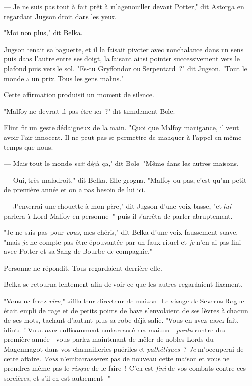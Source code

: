 --- Je ne suis pas tout à fait prêt à m'agenouiller devant Potter," dit Astorga en regardant Jugson droit dans les yeux.

"Moi non plus," dit Belka.

Jugson tenait sa baguette, et il la faisait pivoter avec nonchalance dans un sens puis dans l'autre entre ses doigt, la faisant ainsi pointer successivement vers le plafond puis vers le sol. "Es-tu Gryffondor ou Serpentard~?" dit Jugson. "Tout le monde a un prix. Tous les gens malins."

Cette affirmation produisit un moment de silence.

"Malfoy ne devrait-il pas être ici~?" dit timidement Bole.

Flint fit un geste dédaigneux de la main. "Quoi que Malfoy manigance, il veut avoir l'air innocent. Il ne peut pas se permettre de manquer à l'appel en même temps que nous.

--- Mais tout le monde \emph{sait} déjà ça," dit Bole. "Même dans les autres maisons.

--- Oui, très maladroit," dit Belka. Elle grogna. "Malfoy ou pas, c'est qu'un petit de première année et on a pas besoin de lui ici.

--- J'enverrai une chouette à mon père," dit Jugson d'une voix basse, "et \emph{lui} parlera à Lord Malfoy en personne -" puis il s'arrêta de parler abruptement.

"Je ne sais pas pour \emph{vous}, mes chéris," dit Belka d'une voix faussement suave, "mais \emph{je} ne compte pas être épouvantée par un faux rituel et \emph{je} n'en ai pas fini avec Potter et sa Sang-de-Bourbe de compagnie."

Personne ne répondit. Tous regardaient derrière elle.

Belka se retourna lentement afin de voir ce que les autres regardaient fixement.

"Vous ne ferez \emph{rien}," siffla leur directeur de maison. Le visage de Severus Rogue était empli de rage et de petits points de bave s'envolaient de ses lèvres à chacun de ses mots, tachant d'autant plus sa robe déjà salie. "Vous en avez \emph{assez} fait, idiots~! Vous avez suffisamment embarrassé ma maison - \emph{perdu} contre des première année - vous parlez maintenant de mêler de nobles Lords du Magenmagot dans vos chamailleries puériles et \emph{pathétiques}~? \emph{Je} m'occuperai de cette affaire. \emph{Vous} n'embarrasserez pas de nouveau cette maison et vous ne prendrez même pas le \emph{risque} de le faire~! C'en est \emph{fini} de vos combats contre ces sorcières, et s'il en est autrement -"

